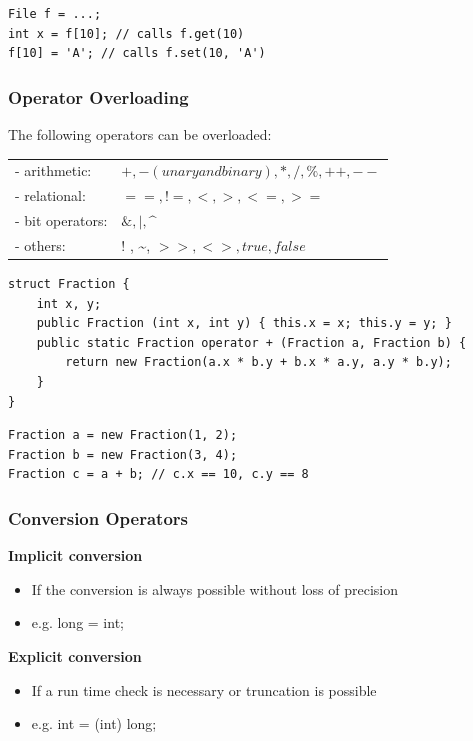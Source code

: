 \begin{lstlisting}
File f = ...;
int x = f[10]; // calls f.get(10)
f[10] = 'A'; // calls f.set(10, 'A')
\end{lstlisting}

\subsubsection{Operator Overloading}
The following operators can be overloaded:\\
\begin{tabular}{ll}
	- arithmetic:    & $+, - (unary and binary), *, /, \%, ++, -- $ \\
	- relational:    & $==, !=, <, >, <=, >=$                       \\
	- bit operators: & $\&,|, \text{\textasciicircum}$              \\
	- others:        & $!$ , \textasciitilde, $>>,<>, true, false$  \\
\end{tabular}
\begin{multicols}{2}
\begin{lstlisting}
struct Fraction {
	int x, y;
	public Fraction (int x, int y) { this.x = x; this.y = y; }
	public static Fraction operator + (Fraction a, Fraction b) {
		return new Fraction(a.x * b.y + b.x * a.y, a.y * b.y);
	}
}
\end{lstlisting}
\columnbreak
\begin{lstlisting}
Fraction a = new Fraction(1, 2);
Fraction b = new Fraction(3, 4);
Fraction c = a + b; // c.x == 10, c.y == 8
\end{lstlisting}
\end{multicols}

\subsubsection{Conversion Operators}
\begin{multicols}{2}
\textbf{Implicit conversion}
\begin{itemize}
	\item If the conversion is always possible without loss of precision
	\item e.g. long = int;
\end{itemize}
\columnbreak
\textbf{Explicit conversion}
\begin{itemize}
	\item If a run time check is necessary or truncation is possible
	\item e.g. int = (int) long;
\end{itemize}
\end{multicols}


